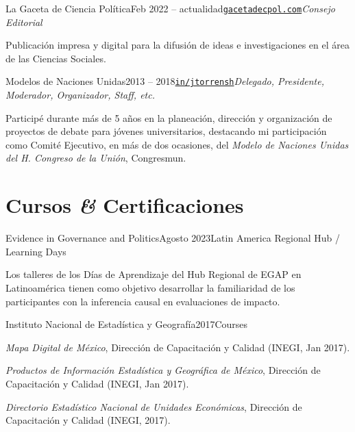 \documentclass[letter]{resume}
\begin{document}
\begin{content}
\begin{position}{La Gaceta de Ciencia Política}{Feb 2022 -- actualidad}{\normalfont\href{https://gacetadecpol.com/}{\texttt{gacetadecpol.com}}}{\emph{Consejo Editorial}}{}
  \item Publicación impresa y digital para la difusión de ideas e investigaciones en el área de las Ciencias Sociales.
\end{position}

\begin{position}{Modelos de Naciones Unidas}{2013 -- 2018}{\normalfont\href{https://www.linkedin.com/in/jtorrensh/}{\texttt{in/jtorrensh}}}{\emph{Delegado, Presidente, Moderador, Organizador, Staff, etc.}}{}
  \item Participé durante más de 5 años en la planeación, dirección y organización de proyectos de debate para jóvenes universitarios, destacando mi participación como Comité Ejecutivo,  en más de dos ocasiones, del \emph{Modelo de Naciones Unidas del H. Congreso de la Unión}, Congresmun.
\end{position}

\sectionlineskip
\end{content}


\section{Cursos \textbf{\em\&} Certificaciones}

\begin{content}

\begin{position}{Evidence in Governance and Politics}{Agosto 2023}{Latin America Regional Hub / Learning Days}{}{}
\item Los talleres de los Días de Aprendizaje del Hub Regional de EGAP en Latinoamérica tienen como objetivo desarrollar la familiaridad de los participantes con la inferencia causal en evaluaciones de impacto.
\end{position}

\begin{position}{Instituto Nacional de Estadística y Geografía}{2017}{Courses}{}{}
\item \emph{Mapa Digital de México}, Dirección de Capacitación y Calidad (INEGI, Jan 2017).
\item \emph{Productos de Información Estadística y Geográfica de México}, Dirección de Capacitación y Calidad (INEGI, Jan 2017).
\item \emph{Directorio Estadístico Nacional de Unidades Económicas}, Dirección de Capacitación y Calidad (INEGI, 2017).
\end{position}

\end{content}
\end{document}
